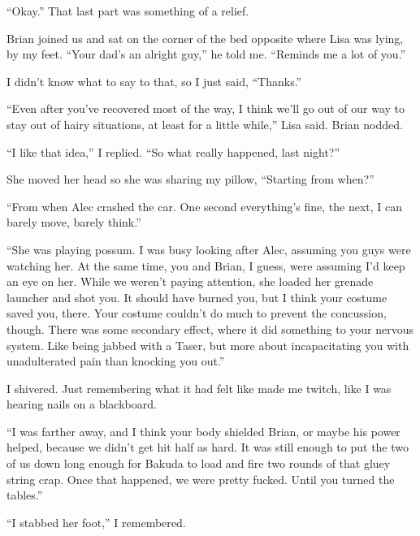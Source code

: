``Okay.''  That last part was something of a relief.



Brian joined us and sat on the corner of the bed opposite where Lisa was lying, by my feet.  ``Your dad's an alright guy,'' he told me.  ``Reminds me a lot of you.''



I didn't know what to say to that, so I just said, ``Thanks.''



``Even after you've recovered most of the way, I think we'll go out of our way to stay out of hairy situations, at least for a little while,'' Lisa said.  Brian nodded.



``I like that idea,'' I replied. ``So what really happened, last night?''



She moved her head so she was sharing my pillow, ``Starting from when?''



``From when Alec crashed the car.  One second everything's fine, the next, I can barely move, barely think.''



``She was playing possum.  I was busy looking after Alec, assuming you guys were watching her. At the same time, you and Brian, I guess, were assuming I'd keep an eye on her.  While we weren't paying attention, she loaded her grenade launcher and shot you.  It should have burned you, but I think your costume saved you, there.  Your costume couldn't do much to prevent the concussion, though.  There was some secondary effect, where it did something to your nervous system.  Like being jabbed with a Taser, but more about incapacitating you with unadulterated pain than knocking you out.''



I shivered.  Just remembering what it had felt like made me twitch, like I was hearing nails on a blackboard.



``I was farther away, and I think your body shielded Brian, or maybe his power helped, because we didn't get hit half as hard.  It was still enough to put the two of us down long enough for Bakuda to load and fire two rounds of that gluey string crap.  Once that happened, we were pretty fucked.  Until you turned the tables.''



``I stabbed her foot,'' I remembered.



